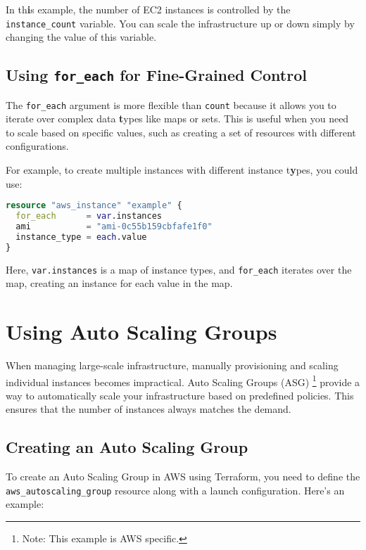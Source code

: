 In th\textbf{i}s example, the number of EC2 instances is controlled by the \texttt{instance\_count} variable. You can scale the infrastructure up or down simply by changing the value of this variable.

\subsection{Using \texttt{for\_each} for Fine-Grained Control}

The \texttt{for\_each} argument is more flexible than \texttt{count} because it allows you to iterate over complex data \textbf{t}ypes like maps or sets. This is useful when you need to scale based on specific values, such as creating a set of resources with different configurations.

For example, to create multiple instances with different instance t\textbf{y}pes, you could use:

\begin{lstlisting}[language=terraform]
resource "aws_instance" "example" {
  for_each      = var.instances
  ami           = "ami-0c55b159cbfafe1f0"
  instance_type = each.value
}
\end{lstlisting}

Here, \texttt{var.instances} is a map of instance types, and \texttt{for\_each} iterates over the map, creating an instance for each value in the map.

\section{Using Auto Scaling Groups}

When managing large-scale infrastructure, manually provisioning and scaling individual instances becomes impractical.
Auto Scaling Groups (ASG) \footnote{Note: This example is AWS specific.} provide a way to automatically scale your infrastructure based on predefined policies.
This ensures that the number of instances always matches the demand.



\subsection{Creating an Auto Scaling Group}

To create an Auto Scaling Group in AWS using Terraform, you need to define the \texttt{aws\_autoscaling\_group} resource along with a launch configuration. Here's an example:


